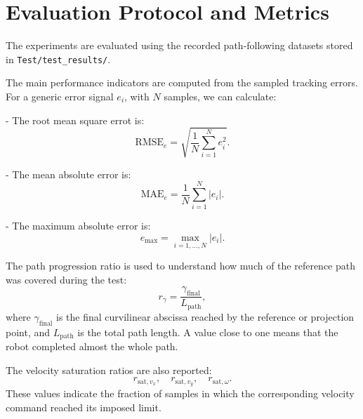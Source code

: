 \newpage

\section{Evaluation Protocol and Metrics}
\label{sec:evaluation_protocol}

The experiments are evaluated using the recorded path-following datasets stored
in \texttt{Test/test\_results/}.

\vspace{0.2cm}

The main performance indicators are computed from the sampled tracking errors.
For a generic error signal \(e_i\), with \(N\) samples, we can calculate:

- The root mean square errot is:
\begin{equation}
    \mathrm{RMSE}_{e}
    =
    \sqrt{
        \frac{1}{N}
        \sum_{i=1}^{N} e_i^2
    }.
\end{equation}

- The mean absolute error is:
\begin{equation}
    \mathrm{MAE}_{e}
    =
    \frac{1}{N}
    \sum_{i=1}^{N} |e_i|.
\end{equation}

- The maximum absolute error is:
\begin{equation}
    e_{\max}
    =
    \max_{i=1,\dots,N} |e_i|.
\end{equation}

\vspace{0.2cm}

The path progression ratio is used to understand how much of the reference path
was covered during the test:
\begin{equation}
    r_{\gamma}
    =
    \frac{\gamma_{\mathrm{final}}}{L_{\mathrm{path}}},
\end{equation}
where \(\gamma_{\mathrm{final}}\) is the final curvilinear abscissa reached by
the reference or projection point, and \(L_{\mathrm{path}}\) is the total path
length. A value close to one means that the robot completed almost the whole
path.

The velocity saturation ratios are also reported:
\begin{equation}
    r_{\mathrm{sat},v_x}, \quad
    r_{\mathrm{sat},v_y}, \quad
    r_{\mathrm{sat},\omega}.
\end{equation}
These values indicate the fraction of samples in which the corresponding
velocity command reached its imposed limit.


